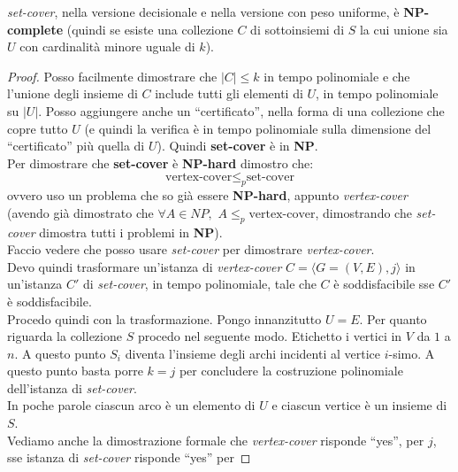 										\begin{teorema}
											\textit{set-cover}, nella versione decisionale e nella
											versione con peso uniforme, è \textbf{NP-complete} (quindi se esiste una
											collezione $C$ di sottoinsiemi di $S$ 
											la cui unione sia $U$ con cardinalità minore uguale di $k$).
										\end{teorema}
										\begin{proof}
											Posso facilmente dimostrare che $|C|\leq k$ in tempo polinomiale e che
											l'unione degli insieme di $C$ include tutti gli elementi di $U$, in
											tempo polinomiale su $|U|$. Posso aggiungere anche un ``certificato'', nella
											forma di una collezione che copre tutto $U$ (e quindi la verifica è in tempo
											polinomiale sulla dimensione del ``certificato'' più quella di $U$). Quindi
											\textbf{set-cover} è in \textbf{NP}.\\
											Per dimostrare che \textbf{set-cover} è \textbf{NP-hard} dimostro che:
											\[\mbox{vertex-cover} \leq_p \mbox{set-cover}\]
											ovvero uso un problema che so già essere \textbf{NP-hard}, appunto
											\textit{vertex-cover} (avendo già dimostrato che $\forall A\in NP, \,\,A\leq_p
											\mbox{vertex-cover}$, dimostrando che \textit{set-cover} dimostra tutti i
											problemi in \textbf{NP}).\\
											Faccio vedere che posso usare \textit{set-cover} per dimostrare
											\textit{vertex-cover}.\\
											Devo quindi trasformare un'istanza di \textit{vertex-cover} $C=\langle
											G=(V,E), j\rangle$ in un'istanza $C'$ di \textit{set-cover}, in tempo
											polinomiale, tale che $C$ è soddisfacibile sse $C'$ è soddisfacibile.\\
											Procedo quindi con la trasformazione. Pongo innanzitutto $U=E$. Per quanto
											riguarda la collezione $S$ procedo nel seguente modo. Etichetto i vertici in
											$V$ da $1$ a $n$. A questo punto $S_i$ diventa l'insieme degli archi incidenti
											al vertice $i$-simo. A questo punto basta porre $k=j$ per concludere la
											costruzione polinomiale dell'istanza di \textit{set-cover}.\\
											In poche parole ciascun arco è un elemento di $U$ e ciascun vertice è un
											insieme di $S$.\\
											Vediamo anche la dimostrazione formale che \textit{vertex-cover} risponde
											``yes'', per $j$, sse istanza di \textit{set-cover} risponde ``yes'' per

\end{proof}
